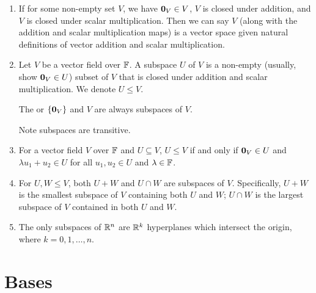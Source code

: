 \documentclass{styles/note}
\begin{document}
  \begin{enumerate}[label=(\alph*)]
    \item If for some non-empty set $V$, we have $\vb{0}_V \in V$, $V$ is closed under addition, and $V$ is closed under scalar multiplication. Then we can say $V$ (along with the addition and scalar multiplication maps) is a vector space given natural definitions of vector addition and scalar multiplication.
    
    \item Let $V$ be a vector field over $\mathbb{F}$. A subspace $U$ of $V$ is a non-empty (usually, show $\vb{0}_V \in U$) subset of $V$ that is closed under addition and scalar multiplication. We denote $U \leqslant V$.
    
      The  or  $\set{\vb{0}_V}$ and $V$ are always subspaces of $V$.
      
      Note subspaces are transitive.
    
    \item {}
      For a vector field $V$ over $\mathbb{F}$ and $U \subseteq V$, $U \leqslant V$ if and only if $\vb{0}_V \in U$ and $\lambda u_1 + u_2 \in U$ for all $u_1, u_2 \in U$ and $\lambda \in \mathbb{F}$.
    
    \item For $U, W \leqslant V$, both $U + W$ and $U \cap W$ are subspaces of $V$. Specifically, $U + W$ is the smallest subspace of $V$ containing both $U$ and $W$; $U \cap W$ is the largest subspace of $V$ contained in both $U$ and $W$.
    
    \item The only subspaces of $\mathbb{R}^n$ are $\mathbb{R}^k$ hyperplanes which intersect the origin, where $k = 0, 1, \dots, n$.
  \end{enumerate}


\newpage
\section{Bases}
  
\end{document}
